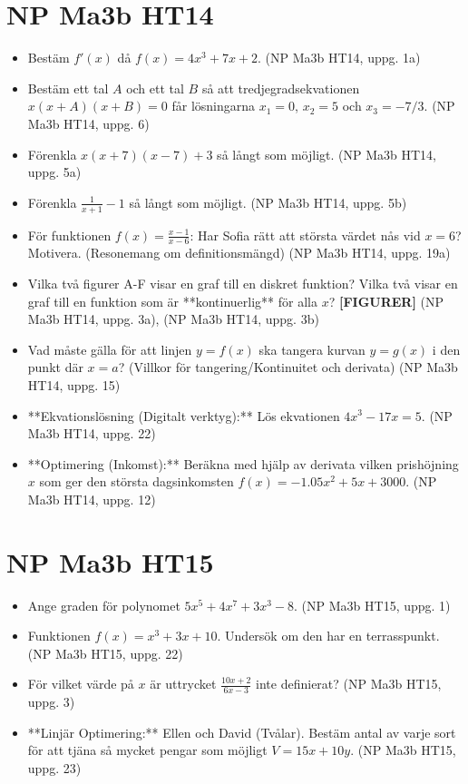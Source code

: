 \documentclass{article}
\begin{document}
\section*{NP Ma3b HT14}
\begin{itemize}
    \item Bestäm $f'(x)$ då $f(x) = 4x^3 + 7x + 2$. (NP Ma3b HT14, uppg. 1a)
    \item Bestäm ett tal $A$ och ett tal $B$ så att tredjegradsekvationen $x(x+A)(x+B)=0$ får lösningarna $x_1=0$, $x_2=5$ och $x_3 = -7/3$. (NP Ma3b HT14, uppg. 6)
    \item Förenkla $x(x+7)(x-7)+3$ så långt som möjligt. (NP Ma3b HT14, uppg. 5a)
    \item Förenkla $\frac{1}{x+1} - 1$ så långt som möjligt. (NP Ma3b HT14, uppg. 5b)
    \item För funktionen $f(x) = \frac{x-1}{x-6}$: Har Sofia rätt att största värdet nås vid $x=6$? Motivera. (Resonemang om definitionsmängd) (NP Ma3b HT14, uppg. 19a)
    \item Vilka två figurer A-F visar en graf till en diskret funktion? Vilka två visar en graf till en funktion som är **kontinuerlig** för alla $x$? \textbf{[FIGURER]} (NP Ma3b HT14, uppg. 3a), (NP Ma3b HT14, uppg. 3b)
    \item Vad måste gälla för att linjen $y=f(x)$ ska tangera kurvan $y=g(x)$ i den punkt där $x=a$? (Villkor för tangering/Kontinuitet och derivata) (NP Ma3b HT14, uppg. 15)
    \item **Ekvationslösning (Digitalt verktyg):** Lös ekvationen $4x^3 - 17x = 5$. (NP Ma3b HT14, uppg. 22)
    \item **Optimering (Inkomst):** Beräkna med hjälp av derivata vilken prishöjning $x$ som ger den största dagsinkomsten $f(x) = -1.05x^2 + 5x + 3000$. (NP Ma3b HT14, uppg. 12)
\end{itemize}

\section*{NP Ma3b HT15}
\begin{itemize}
    \item Ange graden för polynomet $5x^5 + 4x^7 + 3x^3 - 8$. (NP Ma3b HT15, uppg. 1)
    \item Funktionen $f(x) = x^3 + 3x + 10$. Undersök om den har en terrasspunkt. (NP Ma3b HT15, uppg. 22)
    \item För vilket värde på $x$ är uttrycket $\frac{10x+2}{6x-3}$ inte definierat? (NP Ma3b HT15, uppg. 3)
    \item **Linjär Optimering:** Ellen och David (Tvålar). Bestäm antal av varje sort för att tjäna så mycket pengar som möjligt $V=15x+10y$. (NP Ma3b HT15, uppg. 23)
\end{itemize}
\end{document}
